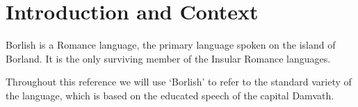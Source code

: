 \chapter{Introduction and Context}\label{ch:introduction}

Borlish is a Romance language, the primary language spoken on the island of Borland. It is the only surviving member of the Insular Romance languages.

Throughout this reference we will use `Borlish' to refer to the standard variety of the language, which is based on the educated speech of the capital Damvath.

%
